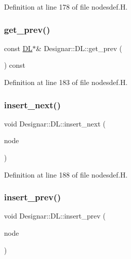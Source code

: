 Definition at line 178 of file nodesdef.\+H.

\mbox{\label{class_designar_1_1_d_l_a2f7ae6156dd09a783b6d1fc726af47c0}} 
\subsubsection{\texorpdfstring{get\+\_\+prev()}{get\_prev()}\hspace{0.1cm}{\footnotesize\ttfamily [2/2]}}
{\footnotesize\ttfamily const \hyperlink{class_designar_1_1_d_l}{DL}$\ast$\& Designar\+::\+D\+L\+::get\+\_\+prev (\begin{DoxyParamCaption}{ }\end{DoxyParamCaption}) const\hspace{0.3cm}{\ttfamily [inline]}}



Definition at line 183 of file nodesdef.\+H.

\mbox{\label{class_designar_1_1_d_l_a668fa2d4441cdbdba8640fbdab1b220c}} 
\subsubsection{\texorpdfstring{insert\+\_\+next()}{insert\_next()}}
{\footnotesize\ttfamily void Designar\+::\+D\+L\+::insert\+\_\+next (\begin{DoxyParamCaption}\item[{\hyperlink{class_designar_1_1_d_l}{DL} $\ast$}]{node }\end{DoxyParamCaption})\hspace{0.3cm}{\ttfamily [inline]}}



Definition at line 188 of file nodesdef.\+H.

\mbox{\label{class_designar_1_1_d_l_a44a3c60cd0f8de9811936cbe78d2e85e}} 
\subsubsection{\texorpdfstring{insert\+\_\+prev()}{insert\_prev()}}
{\footnotesize\ttfamily void Designar\+::\+D\+L\+::insert\+\_\+prev (\begin{DoxyParamCaption}\item[{\hyperlink{class_designar_1_1_d_l}{DL} $\ast$}]{node }\end{DoxyParamCaption})\hspace{0.3cm}{\ttfamily [inline]}}



